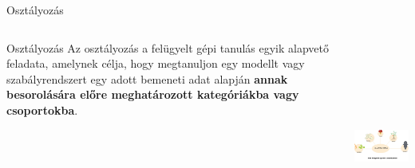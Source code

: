 \documentclass[english, aspectratio=169]{beamer}
\begin{document}
\begin{frame}{Osztályozás}
\begin{columns}
\begin{column}{.5\textwidth}
\begin{block}{Osztályozás}
Az osztályozás a felügyelt gépi tanulás egyik alapvető feladata, amelynek célja, hogy megtanuljon egy modellt vagy szabályrendszert egy adott bemeneti adat alapján \textbf{annak besorolására előre meghatározott kategóriákba vagy csoportokba}. 
\end{block}
\end{column}
\begin{column}{.5\textwidth}
\begin{center}
\includegraphics[width=7cm, height=7cm, keepaspectratio]{images/osztalyozas_4.png}
\end{center}
\end{column}
\end{columns}
\end{frame}
\end{document}

